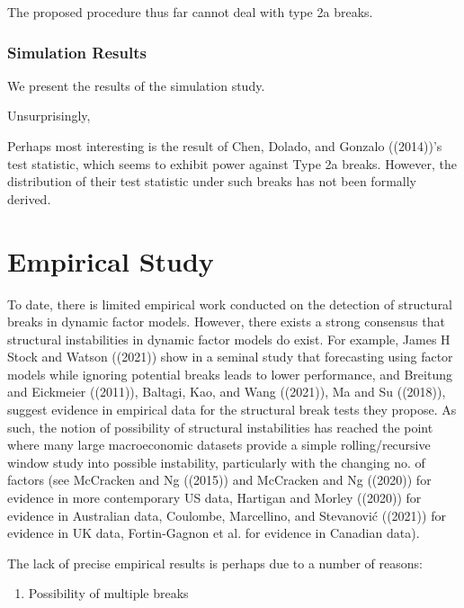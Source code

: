\documentclass[
]{article}
\providecommand{\tightlist}{%
  \setlength{\itemsep}{0pt}\setlength{\parskip}{0pt}}
\begin{document}
The proposed procedure thus far cannot deal with type 2a breaks.

\hypertarget{simulation-results}{%
\subsubsection{Simulation Results}\label{simulation-results}}

We present the results of the simulation study.

Unsurprisingly,

Perhaps most interesting is the result of Chen, Dolado, and Gonzalo
((2014))'s test statistic, which seems to exhibit power against Type 2a
breaks. However, the distribution of their test statistic under such
breaks has not been formally derived.

\newpage


\hypertarget{empirical-study}{%
\section{Empirical Study}\label{empirical-study}}

To date, there is limited empirical work conducted on the detection of
structural breaks in dynamic factor models. However, there exists a
strong consensus that structural instabilities in dynamic factor models
do exist. For example, James H Stock and Watson ((2021)) show in a
seminal study that forecasting using factor models while ignoring
potential breaks leads to lower performance, and Breitung and Eickmeier
((2011)), Baltagi, Kao, and Wang ((2021)), Ma and Su ((2018)), suggest
evidence in empirical data for the structural break tests they propose.
As such, the notion of possibility of structural instabilities has
reached the point where many large macroeconomic datasets provide a
simple rolling/recursive window study into possible instability,
particularly with the changing no. of factors (see McCracken and Ng
((2015)) and McCracken and Ng ((2020)) for evidence in more contemporary
US data, Hartigan and Morley ((2020)) for evidence in Australian data,
Coulombe, Marcellino, and Stevanović ((2021)) for evidence in UK data,
Fortin-Gagnon et al. for evidence in Canadian data).

The lack of precise empirical results is perhaps due to a number of
reasons:

\begin{enumerate}
\def\labelenumi{\arabic{enumi}.}
\tightlist
\item
  Possibility of multiple breaks
\end{enumerate}
\end{document}
